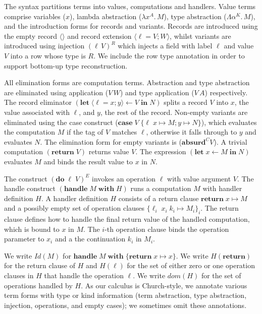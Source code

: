 \documentclass[12pt,mscres,cdtppar,twoside,openright,logo,rightchapter,normalheadings]{infthesis}
\theoremstyle{definition}
\newcommand{\revto}{\ensuremath{\leftarrow}}
\newcommand{\keyw}[1]{\textbf{#1}}
\newcommand{\Handle}{\keyw{handle}}
\newcommand{\With}{\keyw{with}}
\newcommand{\Let}{\keyw{let}}
\newcommand{\In}{\keyw{in}}
\newcommand{\Do}{\keyw{do}}
\newcommand{\Return}{\keyw{return}}
\newcommand{\Case}{\keyw{case}}
\newcommand{\Absurd}{\keyw{absurd}}
\newcommand{\Record}[1]{\ensuremath{\langle #1 \rangle}}
\begin{document}
The syntax partitions terms into values, computations and
handlers. 
%
Value terms comprise variables ($x$), %
lambda abstraction ($\lambda x^A . \, M$), type abstraction ($\Lambda
\alpha^K . \, M$), and the introduction forms for records and
variants. Records are introduced using the empty record $\Record{}$
and record extension $\Record{\ell = V; W}$, whilst variants are
introduced using injection $(\ell\, V)^R$ which injects a field with
label $\ell$ and value $V$ into a row whose type is $R$. We include
the row type annotation in order to support bottom-up type
reconstruction.

All elimination forms are computation terms. Abstraction and type
abstraction are eliminated using application ($V\,W$) and type
application ($V\,A$) respectively.
%
The record eliminator $(\Let \; \Record{\ell=x;y} \revto V \; \In \;
N)$ splits a record $V$ into $x$, the value associated with $\ell$,
and $y$, the rest of the record. Non-empty variants are eliminated
using the case construct ($\Case\; V\; \{\ell\; x \mapsto M; y \mapsto
N\}$), which evaluates the computation $M$ if the tag of $V$ matches
$\ell$, otherwise it falls through to $y$ and evaluates $N$.  The
elimination form for empty variants is ($\Absurd^C V$). A trivial
computation $(\Return\;V)$ returns value $V$. The expression $(\Let \;
x \revto M \; \In \; N)$ evaluates $M$ and binds the result value to
$x$ in $N$.

The construct $(\Do \; \ell \; V)^E$ invokes an operation $\ell$ with
value argument $V$. The handle construct $(\Handle \; M \; \With \;
H)$ runs a computation $M$ with handler definition $H$. A handler
definition $H$ consists of a return clause $\Return \; x \mapsto M$
and a possibly empty set of operation clauses $\{\ell_i \; x_i \; k_i
\mapsto M_i\}_i$. The return clause defines how to handle the final
return value of the handled computation, which is bound to $x$ in $M$.
%
The $i$-th operation clause binds the operation parameter to $x_i$ and
a the continuation $k_i$ in $M_i$.

We write $Id(M)$ for $\Handle \;M\; \With \; \{\Return\;x \mapsto
x\}$.
%
We write $H(\Return)$ for the return clause of $H$ and $H(\ell)$ for
the set of either zero or one operation clauses in $H$ that handle the
operation $\ell$. We write $dom(H)$ for the set of operations handled
by $H$.
%
As our calculus is Church-style, we annotate various term forms with
type or kind information (term abstraction, type abstraction,
injection, operations, and empty cases); we sometimes omit these
annotations.
\end{document}
